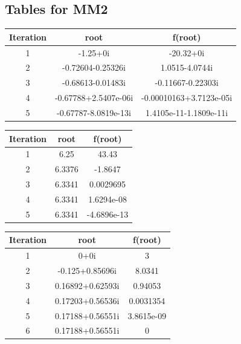 \subsection{Tables for MM2}
\begin{center}
  \begin{tabular}{| c  c c |}
\hline
Iteration & root         & f(root) \\
\hline
1  &       -1.25+0i         &         -20.32+0i    \\
\hline
2  &    -0.72604-0.25326i   &         1.0515-4.0744i  \\
\hline
3  &   -0.68613-0.01483i    &      -0.11667-0.22303i   \\
\hline
4  &   -0.67788+2.5407e-06i &   -0.00010163+3.7123e-05i \\
\hline
5  &    -0.67787-8.0819e-13i &    1.4105e-11-1.1809e-11i \\
\hline
 \hline

\end{tabular}
\end{center}

\begin{center}
  \begin{tabular}{| c  c c |}
\hline
Iteration & root         & f(root) \\
\hline
1   &     6.25    &       43.43 \\
\hline
2   &   6.3376    &     -1.8647 \\
\hline
3   &  6.3341     &  0.0029695 \\
\hline
4   &   6.3341    &  1.6294e-08 \\
\hline
5   &   6.3341    & -4.6896e-13 \\
\hline
\hline

\end{tabular}
\end{center}

\begin{center}
  \begin{tabular}{| c  c c |}
\hline
Iteration & root         & f(root) \\
\hline
1   &         0+0i          &            3 \\
\hline
2   &    -0.125+0.85696i    &       8.0341 \\
\hline
3   &   0.16892+0.62593i    &      0.94053 \\
\hline
4   &   0.17203+0.56536i    &    0.0031354  \\
\hline
5   &   0.17188+0.56551i    &   3.8615e-09  \\
\hline
6   &   0.17188+0.56551i    &            0  \\
\hline
\hline

\end{tabular}
\end{center}

